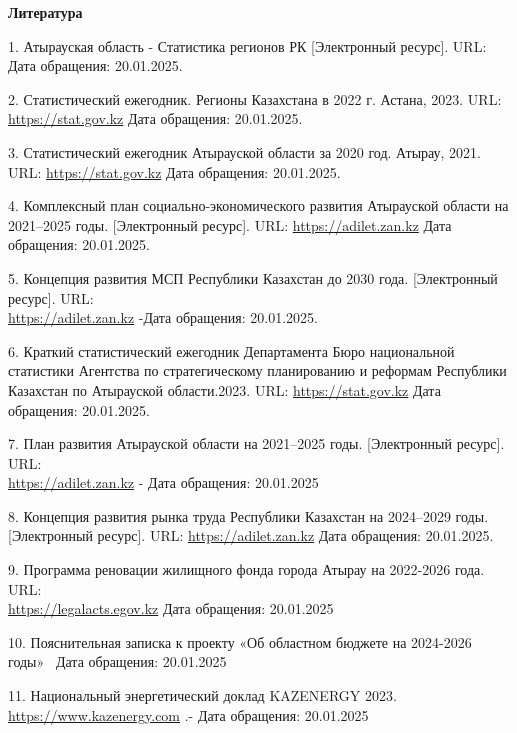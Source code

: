 \begin{center}
{\bfseries Литература}
\end{center}

\begin{references}
1. Атырауская область - Статистика регионов РК {[}Электронный ресурс{]}.
URL:  Дата обращения: 20.01.2025.

2. Статистический ежегодник. Регионы Казахстана в 2022 г. Астана, 2023.
URL:
\href{https://stat.gov.kz/ru/publication/collections/?year=2022&name=17195&period=year-}{https://stat.gov.kz}
Дата обращения: 20.01.2025.

3. Статистический ежегодник Атырауской области за 2020 год. Атырау,
2021. URL:
\href{https://stat.gov.kz/ru/region/atyrau/collections/?year=2020&period=year&name=120885-}{https://stat.gov.kz}
Дата обращения: 20.01.2025.

4. Комплексный план социально-экономического развития Атырауской области
на 2021--2025 годы. {[}Электронный ресурс{]}. URL:
\href{https://adilet.zan.kz/rus/docs/P2100000337-}{https://adilet.zan.kz}
Дата обращения: 20.01.2025.

5. Концепция развития МСП Республики Казахстан до 2030 года.
{[}Электронный ресурс{]}. URL:\\
\href{https://adilet.zan.kz/rus/docs/P2300001050/history}{https://adilet.zan.kz}
-Дата обращения: 20.01.2025.

6. Краткий статистический ежегодник Департамента Бюро национальной
статистики Агентства по стратегическому планированию и реформам
Республики Казахстан по Атырауской области.2023. URL:
\href{https://stat.gov.kz/ru/region/atyrau/collections/?year=2022&period=year&name=52710-}{https://stat.gov.kz}
Дата обращения: 20.01.2025.

7. План развития Атырауской области на 2021--2025 годы. {[}Электронный
ресурс{]}. URL:\\
\href{https://adilet.zan.kz/rus/docs/P2100000337}{https://adilet.zan.kz}
- Дата обращения: 20.01.2025

8. Концепция развития рынка труда Республики Казахстан на 2024--2029
годы. {[}Электронный ресурс{]}. URL:
\href{https://adilet.zan.kz/rus/docs/P2300001050/history-}{https://adilet.zan.kz}
Дата обращения: 20.01.2025.

9. Программа реновации жилищного фонда города Атырау на 2022-2026 года.
URL:\\
\href{https://legalacts.egov.kz/npa/view?id=14132167-}{https://legalacts.egov.kz}
Дата обращения: 20.01.2025

10. Пояснительная записка к проекту «Об областном бюджете на 2024-2026
годы»~ Дата обращения: 20.01.2025

11. Национальный энергетический доклад \textsc{KAZENERGY 2023.}
\href{https://www.kazenergy.com/ru/operation/ned/2117/}{https://www.kazenergy.com}
.- Дата обращения: 20.01.2025
\end{references}

